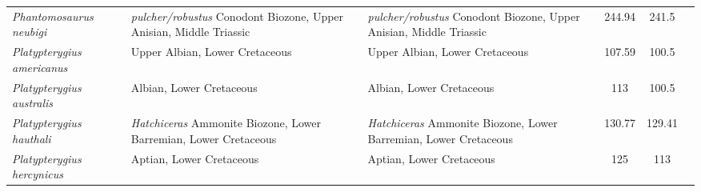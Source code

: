 \begin{longtabu}{>{\itshape}lXXSSl}
	Phantomosaurus neubigi                               &
        \emph{pulcher/robustus} Conodont Biozone, Upper Anisian, Middle Triassic
                                                             &
        \emph{pulcher/robustus} Conodont Biozone, Upper Anisian, Middle Triassic
                                                             & 244.94
                                                             & 241.5
                                                             &
                                                             \cite{Sander1997AMR} \\                     
	Platypterygius americanus                            & Upper Albian,
        Lower Cretaceous
                                                             & Upper Albian,
        Lower Cretaceous
                                                             & 107.59
                                                             & 100.5
                                                             &
                                                             \cite{Romer1968CGUSC} \\                      
	Platypterygius australis                             & Albian, Lower
        Cretaceous
                                                             & Albian, Lower
        Cretaceous
                                                             & 113
                                                             & 100.5
                                                             &
                                                             \cite{Wade1984L,Wade1990MQM} \\              
	Platypterygius hauthali                              &
        \emph{Hatchiceras} Ammonite Biozone, Lower Barremian, Lower Cretaceous
                                                             &
        \emph{Hatchiceras} Ammonite Biozone, Lower Barremian, Lower Cretaceous
                                                             & 130.77
                                                             & 129.41
                                                             &
                                                             \cite{Fernandez2005JVP} \\                  
	Platypterygius hercynicus                            & Aptian, Lower
        Cretaceous
                                                             & Aptian, Lower
        Cretaceous
                                                             & 125
                                                             & 113

\end{longtabu}
